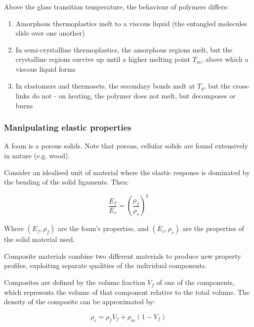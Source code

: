 \documentclass{article}
\begin{document}
Above the glass transition temperature, the behaviour of polymers differs:

\begin{enumerate}
    \item Amorphous thermoplastics melt to a viscous liquid (the entangled molecules slide over one another)
    \item In semi-crystalline thermoplastics, the amorphous regions melt, but the crystalline regions survive up until a higher melting point $T_m$, above which a viscous liquid forms
    \item In elastomers and thermosets, the secondary bonds melt at $T_g$, but the cross-links do not - on heating, the polymer does not melt, but decomposes or burns
\end{enumerate}

\subsubsection{Manipulating elastic properties}

\begin{definition}[Foam]
    A foam is a porous solids. Note that porous, cellular solids are found extensively in nature (e.g. wood).
\end{definition}

\begin{proposition}
    Consider an idealised unit of material where the elastic response is dominated by the bending of the solid ligaments. Then:

    \[ \frac{E_f}{E_s} = \left(\frac{\rho_f}{\rho_s}\right)^2 \]

    Where $(E_f, \rho_f)$ are the foam's properties, and $(E_s, \rho_s)$ are the properties of the solid material used.
\end{proposition}

\begin{definition}[Composite]
    Composite materials combine two different materials to produce new property profiles, exploiting separate qualities of the individual components.
\end{definition}

Composites are defined by the volume fraction $V_f$ of one of the components, which represents the volume of that component relative to the total volume. The density of the composite can be approximated by:

\[ \rho_c = \rho_f V_f + \rho_m (1 - V_f) \]
\end{document}
